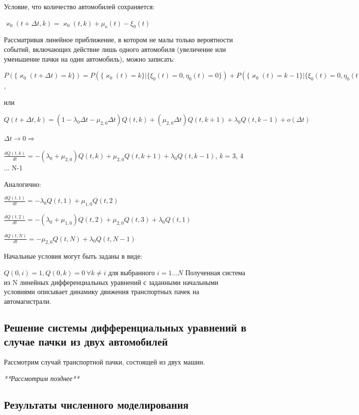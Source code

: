 \documentclass[a4paper, 14pt, russian]{article}
\begin{document}
Условие, что количество автомобилей сохраняется:

$\varkappa_0(t + \Delta t, k) = \varkappa_0(t, k) + \mu_o(t) - \xi_0(t)$

Рассматривая линейное приближение, в котором не малы только вероятности событий, включающих действие лишь одного автомобиля (увеличение или уменьшение пачки на один автомобиль), можно записать:

$P(\{\varkappa_0(t + \Delta t) = k\}) = P(\{\varkappa_0(t) = k\} | \{\xi_0(t) = 0, \eta_0(t) = 0\}) + P(\{\varkappa_0(t) = k-1\} | \{\xi_0(t) = 0, \eta_0(t) = 1\}) + 
P(\{\varkappa_0(t) = k+1\} | \{\xi_0(t) = 1, \eta_0(t) = 0\}) + o(\Delta t)$,

или

$Q(t + \Delta t, k) = (1 - \lambda_0 \Delta t - \mu_{2,0} \Delta t ) Q(t, k) + (\mu_{2,0} \Delta t) Q(t, k+1) + \lambda_0 Q(t, k-1) + o(\Delta t)$

$\Delta t \rightarrow 0\Rightarrow $

$\frac{dQ(t, k)}{dt} = -(\lambda_0 + \mu_{2,0}) Q(t, k) + \mu_{2,0} Q(t, k + 1) + 
\lambda_0 Q(t, k-1)$, \textit{k} = 3, 4 ... N-1

Аналогично:

$\frac{dQ(t, 1)}{dt} = -\lambda_0 Q(t, 1) + \mu_{1,0} Q(t, 2)$

$\frac{dQ(t, 2)}{dt} = -(\lambda_0 + \mu_{1,0}) Q(t, 2) + \mu_{2,0} Q(t, 3) + 
\lambda_0 Q(t, 1)$

$\frac{dQ(t, N)}{dt} = - \mu_{2,0} Q(t, N) + \lambda_0 Q(t, N - 1)$

Начальные условия могут быть заданы в виде:

$Q(0, i) = 1, Q(0, k) = 0 \ \forall k \neq i$ для выбранного $i = 1 ... N$
Полученная  система из N линейных дифференциальных уравнений с заданными начальными условиями описывает динамику движения транспортных пачек на автомагистрали.

\subsection{Решение системы дифференциальных уравнений в случае пачки из двух автомобилей}
Рассмотрим случай транспортной пачки, состоящей из двух машин.

\textit{**Рассмотрим позднее**}

\subsection{Результаты численного моделирования}
\end{document}
